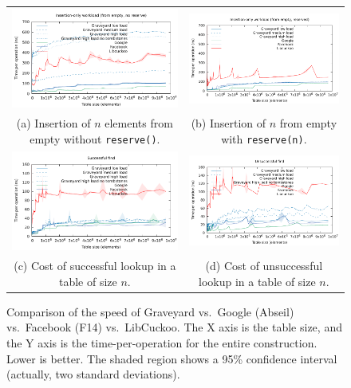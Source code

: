 \documentclass[10pt]{article}
\theoremstyle{remark}
\theoremstyle{remark}
\newcommand{\figlabel}[1]{\label{fig:#1}}
\begin{document}
\begin{figure}
  \begin{center}
    \begin{tabular}{cc}
    \includegraphics[width=75mm]{experiments/library-insertion} &
    \includegraphics[width=75mm]{experiments/library-reserved-insertion} \\
    (a) Insertion of $n$ elements from empty without \texttt{reserve()}. &
    (b) Insertion of $n$ from empty with \texttt{reserve(n)}. \\
    \includegraphics[width=75mm]{experiments/library-found} &
    \includegraphics[width=75mm]{experiments/library-notfound} \\
    (c) Cost of successful lookup in a table of size $n$. &
    (d) Cost of unsuccessful lookup in a table of size $n$. \\
    \end{tabular}
  \end{center}
\caption{Comparison of the speed of Graveyard vs.~Google (Abseil)
  vs.~Facebook (F14) vs.~LibCuckoo.  The X axis is the table size, and
  the Y axis is the time-per-operation for the entire construction.
  Lower is better.  The shaded region shows a 95\% confidence interval
  (actually, two standard deviations).}
\figlabel{libraries}
\end{figure}
\end{document}
